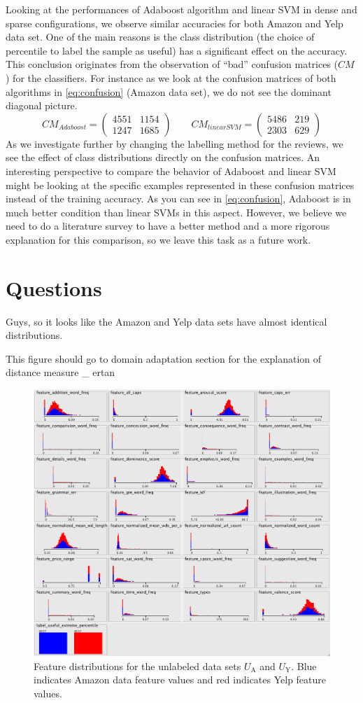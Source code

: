 \documentclass[letterpaper]{article}
\begin{document}
Looking at the performances of Adaboost algorithm and linear SVM in
dense and sparse configurations, we observe similar accuracies for
both Amazon and Yelp data set. One of the main reasons is the class
distribution (the choice of percentile to label the sample as useful)
has a significant effect on the accuracy. This conclusion originates
from the observation of ``bad'' confusion matrices ($CM$) for the
classifiers. For instance as we look at the confusion matrices of both
algorithms in \ref{eq:confusion} (Amazon data set), we do not see the
dominant diagonal picture.
\begin{equation}
\label{eq:confusion}
CM_{Adaboost} = \left(
\begin{matrix}
4551 & 1154\\
1247 & 1685
\end{matrix}
\right)
\qquad
CM_{linearSVM} = \left(
\begin{matrix}
5486 & 219\\
2303 & 629
\end{matrix}
\right)
\end{equation}
As we investigate further by changing the labelling method
for the reviews, we see the effect of class distributions directly on
the confusion matrices. An interesting perspective to compare the
behavior of Adaboost and linear SVM might be looking at the specific
examples represented in these confusion matrices instead of the training
accuracy. As you can see in \ref{eq:confusion}, Adaboost is in much
better condition than linear SVMs in this aspect. However, we believe
we need to do a literature survey to have a better method and a more
rigorous explanation
for this comparison, so we leave this task as a future work.

\section{Questions}

Guys, so it looks like the Amazon and Yelp data sets have almost identical distributions.

This figure should go to domain adaptation section for the explanation
of distance measure \_ ertan

\begin{figure}[h]
	\centering
	\includegraphics[width=0.5\linewidth]{adaptation_unlabeled_features}
	\caption{Feature distributions for the unlabeled data sets $U_{\textrm{A}}$ and $U_{\textrm{Y}}$.  
	Blue indicates Amazon data feature values and red indicates Yelp feature values.}
\end{figure}
\end{document}
